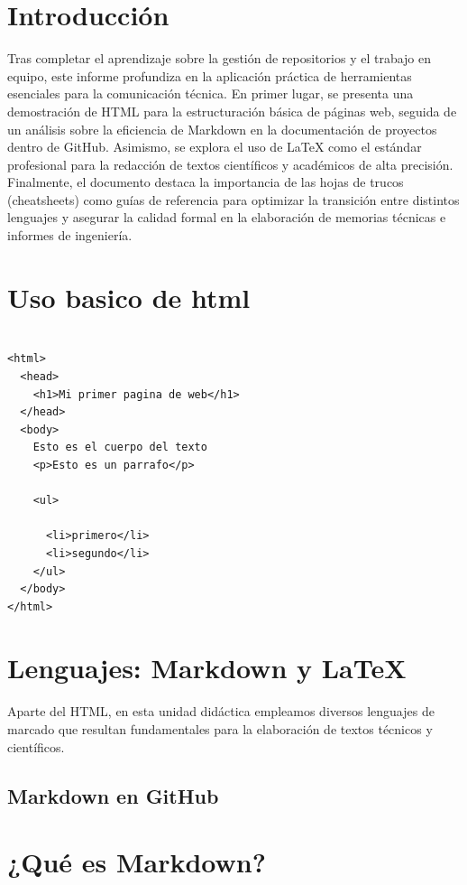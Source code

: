 \documentclass[runningheads]{llncs}
\begin{document}
\section{Introducción}
Tras completar el aprendizaje sobre la gestión de repositorios y el trabajo en equipo, este informe profundiza en la aplicación práctica de herramientas esenciales para la comunicación técnica. En primer lugar, se presenta una demostración de HTML para la estructuración básica de páginas web, seguida de un análisis sobre la eficiencia de Markdown en la documentación de proyectos dentro de GitHub. Asimismo, se explora el uso de LaTeX como el estándar profesional para la redacción de textos científicos y académicos de alta precisión. Finalmente, el documento destaca la importancia de las hojas de trucos (cheatsheets) como guías de referencia para optimizar la transición entre distintos lenguajes y asegurar la calidad formal en la elaboración de memorias técnicas e informes de ingeniería.




\section{Uso basico de html}
\begin{lstlisting}[caption={Estructura básica de un documento HTML5.}, label={list:html_ejemplo}]

<html>
  <head>
    <h1>Mi primer pagina de web</h1>
  </head>
  <body>
    Esto es el cuerpo del texto
    <p>Esto es un parrafo</p>
    
    <ul>
      
      <li>primero</li>
      <li>segundo</li>
    </ul>
  </body>
</html>
\end{lstlisting}


\section{Lenguajes: Markdown y LaTeX}
Aparte del HTML, en esta unidad didáctica empleamos diversos lenguajes de marcado que resultan fundamentales para la elaboración de textos técnicos y científicos.


\subsection{Markdown en GitHub}

\section*{¿Qué es Markdown?}
\end{document}

